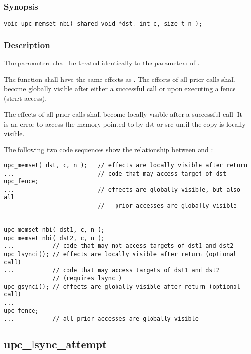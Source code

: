 \subsubsection{Synopsis}

\begin{verbatim}
void upc_memset_nbi( shared void *dst, int c, size_t n );
\end{verbatim}

\subsubsection{Description}

\npf The parameters shall be treated identically to the parameters of
\memset{}.

\np The \function{} function shall have the same effects as \memset{}.
The effects of all prior \function{} calls shall become globally visible after 
either a successful \gsynci{} call or upon executing a fence (strict access).

\np The effects of all prior \function{} calls shall become locally 
visible after a successful \lsynci{} call.  It is an error to access the memory
pointed to by dst or src until the copy is locally visible.

\np The following two code sequences show the relationship between
\memset{} and \function{}:

\begin{verbatim} 
upc_memset( dst, c, n );   // effects are locally visible after return
...                        // code that may access target of dst
upc_fence;                 
...                        // effects are globally visible, but also all
                           //   prior accesses are globally visible


upc_memset_nbi( dst1, c, n );
upc_memset_nbi( dst2, c, n );
...           // code that may not access targets of dst1 and dst2
upc_lsynci(); // effects are locally visible after return (optional call)
...           // code that may access targets of dst1 and dst2
              // (requires lsynci)
upc_gsynci(); // effects are globally visible after return (optional call)
...
upc_fence;
...           // all prior accesses are globally visible
\end{verbatim}

\newpage
\subsection{upc\_lsync\_attempt}
\def\function{{\tt upc\_lsync\_attempt}}

